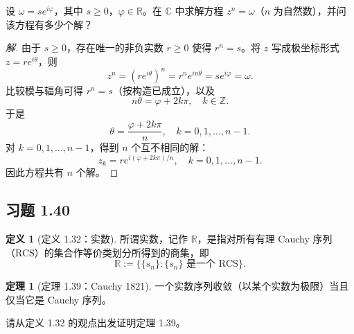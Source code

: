 \documentclass[11pt,a4paper]{article}
\theoremstyle{definition}
\newtheorem{theorem}{定理}[section]
\newtheorem{definition}{定义}[section]
\newenvironment{solution}{\begin{proof}[解]}{\end{proof}}
\begin{document}
设 $\omega = s e^{i\varphi}$，其中 $s \geq 0$，$\varphi \in \mathbb{R}$。在 $\mathbb{C}$ 中求解方程 $z^n = \omega$（$n$ 为自然数），并问该方程有多少个解？

\begin{solution}
由于 $s \ge 0$，存在唯一的非负实数 $r \ge 0$ 使得 $r^n = s$。将 $z$ 写成极坐标形式 $z = r e^{i\theta}$，则
\[
  z^n = (r e^{i\theta})^n = r^n e^{in\theta} = s e^{i\varphi} = \omega.
\]
比较模与辐角可得 $r^n = s$（按构造已成立），以及
\[
  n\theta = \varphi + 2k\pi, \quad k \in \mathbb{Z}.
\]
于是
\[
  \theta = \frac{\varphi + 2k\pi}{n}, \quad k = 0, 1, \dots, n-1.
\]
对 $k = 0, 1, \dots, n-1$，得到 $n$ 个互不相同的解：
\[
  z_k = r e^{i(\varphi + 2k\pi)/n}, \quad k = 0, 1, \dots, n-1.
\]
因此方程共有 $n$ 个解。
\end{solution}

\subsection{习题 1.40}

\begin{definition}[定义 1.32：实数]
  所谓实数，记作 $\mathbb{R}$，是指对所有有理 Cauchy 序列（RCS）的集合作等价类划分所得到的商集，即
  \[
    \mathbb{R} := \{ \{s_n\} : \{s_n\} \text{ 是一个 RCS} \}.
  \]
\end{definition}

\begin{theorem}[定理 1.39：Cauchy 1821]
  一个实数序列收敛（以某个实数为极限）当且仅当它是 Cauchy 序列。
\end{theorem}

请从定义 1.32 的观点出发证明定理 1.39。
\end{document}
